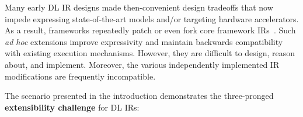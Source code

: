Many early DL IR designs made then-convenient design tradeoffs that
  now impede expressing state-of-the-art models and/or
  targeting hardware accelerators.
As a result, frameworks repeatedly
  patch or even fork core framework IRs~\cite{
    tf_fold, tf_lite, tangent, tf_eager, xla, glow, torchscript}.
Such \textit{ad hoc} extensions improve expressivity and
  maintain backwards compatibility with existing execution mechanisms.
However, they are difficult to design, reason about, and implement.
Moreover, the various independently implemented IR modifications are frequently incompatible.

The scenario presented in the introduction demonstrates the three-pronged \textbf{extensibility challenge}
  for DL IRs:

